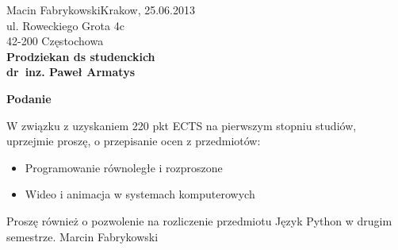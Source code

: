 \documentclass[a4paper, 12pt]{article}
\begin{document}
\flushleft
Macin Fabrykowski\hfill Krakow, 25.06.2013\\
ul. Roweckiego Grota 4c\\
42-200 Częstochowa\\
\vspace{20px}
\flushright
\large\textbf{Prodziekan ds studenckich\\
dr~inz. Paweł Armatys}\\
\vspace{10px}
\begin{center}
\textbf{Podanie}
\end{center}
\normalsize
\flushleft
\vspace{20px}
W związku z uzyskaniem 220 pkt ECTS na pierwszym stopniu studiów, uprzejmie proszę, o przepisanie ocen z przedmiotów:
\begin{itemize}
\item Programowanie równoległe i rozproszone
\item Wideo i animacja w systemach komputerowych
\end{itemize}
Proszę również o pozwolenie na rozliczenie przedmiotu Język Python w drugim semestrze.
\newline
\flushright
\vspace{20px}
Marcin Fabrykowski
\end{document}
